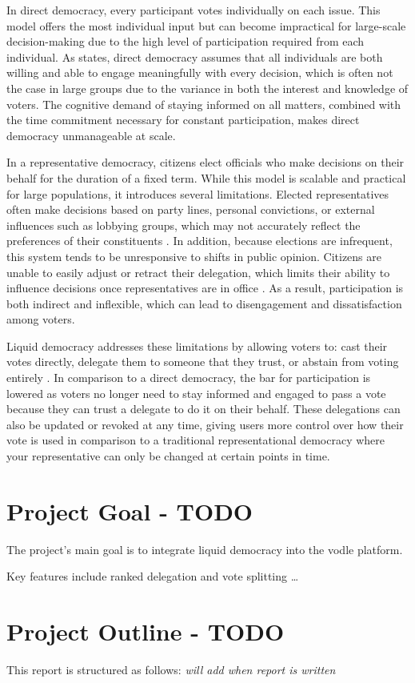 In direct democracy, every participant votes individually on each issue. This model offers the most individual input but can become impractical for large-scale decision-making due to the high level of participation required from each individual. As \citet{ford_delegative_2002} states, direct democracy assumes that all individuals are both willing and able to engage meaningfully with every decision, which is often not the case in large groups due to the variance in both the interest and knowledge of voters. The cognitive demand of staying informed on all matters, combined with the time commitment necessary for constant participation, makes direct democracy unmanageable at scale.

In a representative democracy, citizens elect officials who make decisions on their behalf for the duration of a fixed term. While this model is scalable and practical for large populations, it introduces several limitations. Elected representatives often make decisions based on party lines, personal convictions, or external influences such as lobbying groups, which may not accurately reflect the preferences of their constituents \citep{blum_liquid_2016}. In addition, because elections are infrequent, this system tends to be unresponsive to shifts in public opinion. Citizens are unable to easily adjust or retract their delegation, which limits their ability to influence decisions once representatives are in office \citep{blum_liquid_2016}. As a result, participation is both indirect and inflexible, which can lead to disengagement and dissatisfaction among voters.

Liquid democracy addresses these limitations by allowing voters to: cast their votes directly, delegate them to someone that they trust, or abstain from voting entirely \citep{blum_liquid_2016}. In comparison to a direct democracy, the bar for participation is lowered as voters no longer need to stay informed and engaged to pass a vote because they can trust a delegate to do it on their behalf.
These delegations can also be updated or revoked at any time, giving users more control over how their vote is used in comparison to a traditional representational democracy where your representative can only be changed at certain points in time.

\section{Project Goal - TODO}
The project's main goal is to integrate liquid democracy into the vodle platform.

Key features include ranked delegation and vote splitting \dots

\section{Project Outline - TODO}
This report is structured as follows:
\textit{will add when report is written}